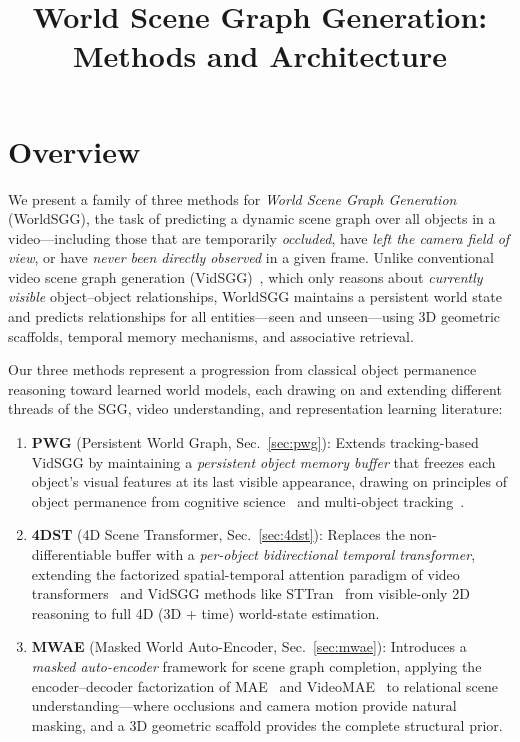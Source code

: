 \documentclass[runningheads]{llncs}
\begin{document}
\title{World Scene Graph Generation: Methods and Architecture}

\maketitle

\section{Overview}
\label{sec:overview}

We present a family of three methods for \emph{World Scene Graph Generation} (WorldSGG), the task of predicting a dynamic scene graph over all objects in a video---including those that are temporarily \emph{occluded}, have \emph{left the camera field of view}, or have \emph{never been directly observed} in a given frame.  Unlike conventional video scene graph generation (VidSGG)~\cite{cong2021spatial,chen2019action}, which only reasons about \emph{currently visible} object--object relationships, WorldSGG maintains a persistent world state and predicts relationships for all entities---seen and unseen---using 3D geometric scaffolds, temporal memory mechanisms, and associative retrieval.

Our three methods represent a progression from classical object permanence reasoning toward learned world models, each drawing on and extending different threads of the SGG, video understanding, and representation learning literature:

\begin{enumerate}
    \item \textbf{PWG} (Persistent World Graph, Sec.~\ref{sec:pwg}): Extends tracking-based VidSGG by maintaining a \emph{persistent object memory buffer} that freezes each object's visual features at its last visible appearance, drawing on principles of object permanence from cognitive science~\cite{piloto2022intuitive} and multi-object tracking~\cite{bewley2016sort}.

    \item \textbf{4DST} (4D Scene Transformer, Sec.~\ref{sec:4dst}): Replaces the non-differentiable buffer with a \emph{per-object bidirectional temporal transformer}, extending the factorized spatial-temporal attention paradigm of video transformers~\cite{arnab2021vivit,bertasius2021space} and VidSGG methods like STTran~\cite{cong2021spatial} from visible-only 2D reasoning to full 4D (3D + time) world-state estimation.

    \item \textbf{MWAE} (Masked World Auto-Encoder, Sec.~\ref{sec:mwae}): Introduces a \emph{masked auto-encoder} framework for scene graph completion, applying the encoder--decoder factorization of MAE~\cite{he2022masked} and VideoMAE~\cite{tong2022videomae} to relational scene understanding---where occlusions and camera motion provide natural masking, and a 3D geometric scaffold provides the complete structural prior.
\end{enumerate}
\end{document}
